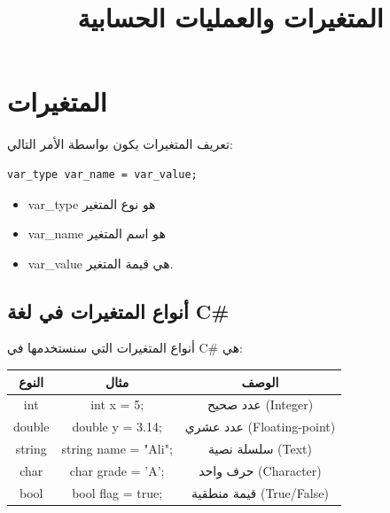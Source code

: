 \documentclass[14pt]{extarticle}
\title{المتغيرات والعمليات الحسابية}
\begin{document}
\maketitle

\section{المتغيرات}

تعريف المتغيرات يكون بواسطة الأمر التالي:

\begin{boxExample}
\begin{english}
\begin{verbatim}
var_type var_name = var_value;
\end{verbatim}
\end{english}
\end{boxExample}

\begin{itemize}
\item \textenglish{var\_type} هو نوع المتغير
\item \textenglish{var\_name} هو اسم المتغير
\item \textenglish{var\_value} هي قيمة المتغير.
\end{itemize}

\subsection{أنواع المتغيرات في لغة \textenglish{C\#}}
أنواع المتغيرات التي سنستخدمها في \textenglish{C\#} هي:

\begin{center}
\begin{tabular}{|c|c|c|}
\hline
النوع & مثال & الوصف \\
\hline
\textenglish{int} & \textenglish{int x = 5;} & عدد صحيح (\textenglish{Integer}) \\
\hline
\textenglish{double} & \textenglish{double y = 3.14;} & عدد عشري (\textenglish{Floating-point}) \\
\hline
\textenglish{string} & \textenglish{string name = "Ali";} & سلسلة نصية (\textenglish{Text}) \\
\hline
\textenglish{char} & \textenglish{char grade = 'A';} & حرف واحد (\textenglish{Character}) \\
\hline
\textenglish{bool} & \textenglish{bool flag = true;} & قيمة منطقية (\textenglish{True/False}) \\
\hline
\end{tabular}
\end{center}
\end{document}
